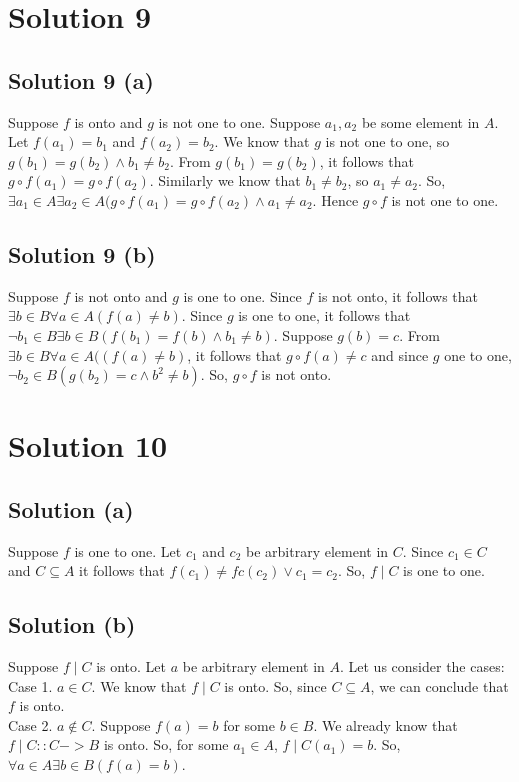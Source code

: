 \documentclass{article}
\begin{document}
\section{Solution 9}
\subsection{Solution 9 (a)}
Suppose $f$ is onto and $g$ is not one to one. Suppose $a_1, a_2$ be
some element in $A$. Let $f(a_1) = b_1$ and $f(a_2) = b_2$. We know
that $g$ is not one to one, so $g(b_1) = g(b_2) \land b_1 \neq b_2$.
From $g(b_1) = g(b_2)$, it follows that $g \circ f(a_1) = g \circ
f(a_2)$. Similarly we know that $b_1 \neq b_2$, so $a_1 \neq a_2$. So,
$\exists a_1 \in A \exists a_2 \in A(g \circ f(a_1) = g \circ f(a_2)
\land a_1 \neq a_2$. Hence $g \circ f$ is not one to one.

\subsection{Solution 9 (b)}
Suppose $f$ is not onto and $g$ is one to one. Since $f$ is not onto,
it follows that $\exists b \in B \forall a \in A(f(a) \neq b)$. Since
$g$ is one to one, it follows that $\neg b_1 \in B \exists b \in
B(f(b_1) = f(b) \land b_1 \neq b)$. Suppose $g(b) = c$. From $\exists
b \in B \forall a \in A((f(a) \neq b)$, it follows that $g \circ f(a)
\neq c$ and since $g$ one to one, $\neg b_2 \in B(g(b_2) = c \land b^2
\neq b)$. So, $g \circ f$ is not onto.

\section{Solution 10}
\subsection{Solution (a)}
Suppose $f$ is one to one. Let $c_1$ and $c_2$ be arbitrary element in
$C$. Since $c_1 \in C$ and $C \subseteq A$ it follows that $f(c_1)
\neq fc(c_2) \lor c_1 = c_2$. So, $f \mid C$ is one to one.

\subsection{Solution (b)}
Suppose $f \mid C$ is onto. Let $a$ be arbitrary element in $A$. Let
us consider the cases:
\\ Case 1. $a \in C$. We know that $f \mid C$ is onto. So, since $C
\subseteq A$, we can conclude that $f$ is onto.
\\ Case 2. $a \notin C$. Suppose $f(a) = b$ for some $b \in B$. We
already know that $f \mid C :: C -> B$ is onto. So, for some $a_1 \in
A$, $f \mid C (a_1) = b$. So, $\forall a \in A \exists b \in B(f(a) =
b)$.
\end{document}
